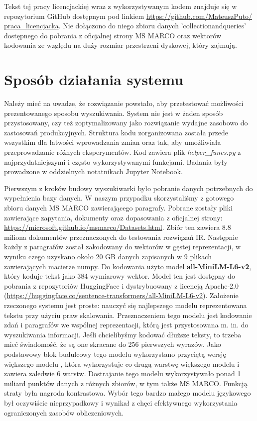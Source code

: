 Tekst tej pracy licencjackiej wraz z wykorzystywanym kodem znajduje się w
repozytorium GitHub dostępnym pod linkiem \url{https://github.com/MateuszPuto/
praca_licencjacka}. Nie dołączono do niego zbioru danych ’collectionandqueries’
dostępnego do pobrania z oficjalnej strony MS MARCO oraz wektorów kodowania
ze względu na duży rozmiar przestrzeni dyskowej, który zajmują.

\section{Sposób działania systemu}
Należy mieć na uwadze, że rozwiązanie powstało, aby przetestować możliwości prezentowanego sposobu wyszukiwania. System nie jest w żaden sposób przystosowany, czy też zoptymalizowany jako rozwiązanie wydajne zasobowo do zastosowań produkcyjnych. Struktura kodu zorganizowana została przede wszystkim dla łatwości wprowadzania zmian oraz tak, aby umożliwiała przeprowadzanie różnych eksperymentów. Kod zawiera plik \emph{helper\_funcs.py} z najprzydatniejszymi i często wykorzystywanymi funkcjami. Badania były prowadzone w oddzielnych notatnikach Jupyter Notebook.\newline

Pierwszym z kroków budowy wyszukiwarki było pobranie danych potrzebnych do wypełnienia bazy danych. W naszym przypadku skorzystaliśmy z gotowego zbioru danych MS MARCO zawierającego paragrafy. Pobrane zostały pliki zawierające zapytania, dokumenty oraz dopasowania z oficjalnej strony: \url{https://microsoft.github.io/msmarco/Datasets.html}. Zbiór ten zawiera 8.8 miliona dokumentów przeznaczonych do testowania rozwiązań IR. Następnie każdy z paragrafów został zakodowany do wektorów w gęstej reprezentacji, w wyniku czego uzyskano około 20 GB danych zapisanych w 9 plikach zawierających macierze numpy. Do kodowania użyto model \textbf{all-MiniLM-L6-v2}, który koduje tekst jako 384 wymiarowy wektor. Model ten jest dostępny do pobrania z repozytoriów HuggingFace i dystrybuowany z licencją Apache-2.0 (\url{https://huggingface.co/sentence-transformers/all-MiniLM-L6-v2}). Założenie rzeczonego systemu jest proste: nauczyć się najlepszego modelu reprezentowana tekstu przy użyciu praw skalowania. Przeznaczeniem tego modelu jest kodowanie zdań i paragrafów we wspólnej reprezentacji, którą jest przystosowana m. in. do wyszukiwania informacji. Jeśli chcielibyśmy kodować dłuższe teksty, to trzeba mieć świadomość, że są one skracane do 256 pierwszych wyrazów. Jako podstawowy blok budulcowy tego modelu wykorzystano przyciętą wersję większego modelu , która wykorzystuje co drugą warstwę większego modelu i zawiera zaledwie 6 warstw. Dostrajanie tego modelu wykorzystywało ponad 1 miliard punktów danych z różnych zbiorów, w tym także MS MARCO. Funkcją straty była nagroda kontrastowa. Wybór tego bardzo małego modelu językowego był oczywiście nieprzypadkowy i wynikał z chęci efektywnego wykorzystania ograniczonych zasobów obliczeniowych.\newline

